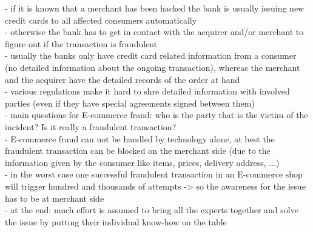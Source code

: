 - if it is known that a merchant has been hacked the bank is usually issuing new credit cards to all affected consumers automatically \\
- otherwise the bank has to get in contact with the acquirer and/or merchant to figure out if the transaction is fraudulent \\
- usually the banks only have credit card related information from a consumer (no detailed information about the ongoing transaction), whereas the merchant and the acquirer have the detailed records of the order at hand \\
- various regulations make it hard to shre detailed information with involved parties (even if they have special agreements signed between them) \\
- main questions for E-commerce fraud: who is the party that is the victim of the incident? Is it really a fraudulent transaction? \\
- E-commerce fraud can not be handled by technology alone, at best the fraudulent transaction can be blocked on the merchant side (due to the information given by the consumer like items, prices, delivery address, ...) \\
- in the worst case one successful fraudulent transaction in an E-commerce shop will trigger hundred and thousands of attempts -> so the awareness for the issue has to be at merchant side \\
- at the end: much effort is assumed to bring all the experts together and solve the issue by putting their individual know-how on the table \\


